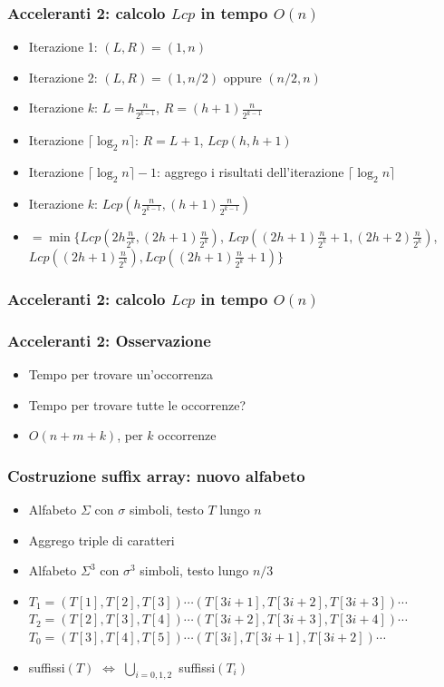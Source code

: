 \begin{frame}[fragile]
\frametitle{Acceleranti 2: calcolo $Lcp$ in tempo $O(n)$}
\begin{itemize}[<+->]
\item
Iterazione 1: $(L,R)=(1,n)$
\item
Iterazione 2: $(L,R)=(1,n/2)$ oppure $(n/2,n)$
\item
Iterazione $k$: $L = h\frac{n}{2^{k-1}}$, $R = (h+1)\frac{n}{2^{k-1}}$
\item
Iterazione $\lceil \log_{2}n\rceil$: $R=L+1$, $Lcp(h,h+1)$
\item
Iterazione $\lceil \log_{2}n\rceil -1$: aggrego i risultati dell'iterazione
$\lceil \log_{2}n\rceil$
\item
Iterazione $k$: $Lcp(h\frac{n}{2^{k-1}}, (h+1)\frac{n}{2^{k-1}})$
\item
$=\min\{Lcp(2h\frac{n}{2^{k}}, (2h+1)\frac{n}{2^{k}})$,
$Lcp((2h+1)\frac{n}{2^{k}}+1, (2h+2)\frac{n}{2^{k}})$,
$Lcp((2h+1)\frac{n}{2^{k}}), Lcp((2h+1)\frac{n}{2^{k}}+1)\}$
\end{itemize}
\end{frame}


\begin{frame}[fragile]
\frametitle{Acceleranti 2: calcolo $Lcp$ in tempo $O(n)$}
\end{frame}

\begin{frame}
\frametitle{Acceleranti 2: Osservazione}
\begin{itemize}[<+->]
\item
Tempo per trovare un'occorrenza
\item
Tempo per trovare tutte le occorrenze?
\item
$O(n+m+k)$, per $k$ occorrenze
\end{itemize}
\end{frame}

\begin{frame}
\frametitle{Costruzione suffix array: nuovo alfabeto}
\begin{itemize}
\item
Alfabeto $\Sigma$ con $\sigma$ simboli, testo $T$ lungo $n$
\item
Aggrego triple di caratteri
\item
Alfabeto $\Sigma^{3}$ con $\sigma^{3}$ simboli, testo lungo $n/3$
\item
$T_{1}=(T[1],T[2],T[3])\cdots (T[3i+1],T[3i+2],T[3i+3])\cdots$\\
$T_{2}=(T[2],T[3],T[4])\cdots (T[3i+2],T[3i+3],T[3i+4])\cdots$\\
$T_{0}=(T[3],T[4],T[5])\cdots (T[3i],T[3i+1],T[3i+2])\cdots$
\item
suffissi$(T)$ $\Leftrightarrow$ $\bigcup_{i=0,1,2}$ suffissi$(T_{i})$
\end{itemize}
\end{frame}

